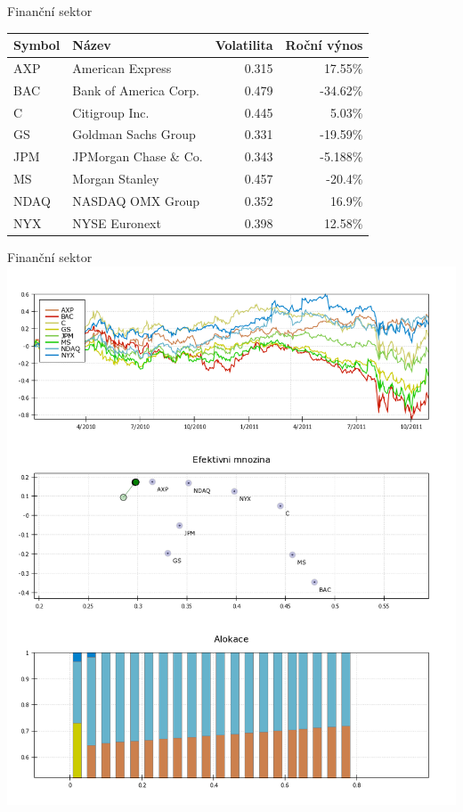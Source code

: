 \begin{frame}{Finanční sektor}
      \begin{tabular}{|l|l|r|r|}
        \hline
        Symbol&Název&Volatilita&Roční výnos\\\hline\hline
        AXP&American Express &0.315&17.55\%\\\hline
        BAC&Bank of America Corp. &0.479&-34.62\%\\\hline
        C&Citigroup Inc. &0.445&5.03\%\\\hline
        GS&Goldman Sachs Group &0.331&-19.59\%\\\hline
        JPM&JPMorgan Chase \& Co. &0.343&-5.188\%\\\hline
        MS&Morgan Stanley &0.457&-20.4\%\\\hline
        NDAQ&NASDAQ OMX Group &0.352&16.9\%\\\hline
        NYX&NYSE Euronext &0.398&12.58\%\\\hline
      \end{tabular}
\end{frame}

\begin{frame}{Finanční sektor}
        \includegraphics[height=0.9\textheight]{fin1.png}
\end{frame}

